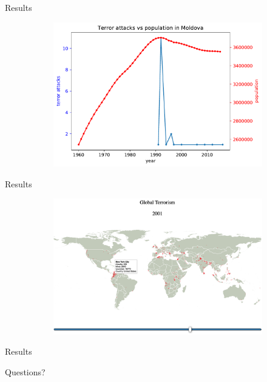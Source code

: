 \documentclass{beamer}
\begin{document}
\begin{frame}{Results}
\begin{figure}
\begin{subfigure}[b]{0.3\textwidth}
			\includegraphics[width=\textwidth]{Population-Terror/attackVsPopulationMoldova}
		\end{subfigure}
	\end{figure}
\end{frame}


\begin{frame}{Results}
	\begin{figure}
		\begin{subfigure}[b]{\textwidth}
			\includegraphics[width=\textwidth]{911.png}
		\end{subfigure}
	\end{figure}
\end{frame}


\begin{frame}{Results}
\centering
\end{frame}


\begin{frame}
	{\huge Questions?}
\end{frame}
\end{document}
